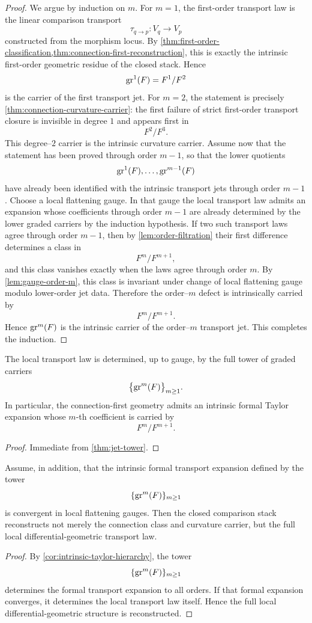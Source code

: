 \begin{proof}
	We argue by induction on \(m\).
	For \(m=1\), the first-order transport law is the linear comparison
	transport
	\[
		\tau_{q\to p}:V_q\to V_p
	\]
	constructed from the morphism locus.  By
	\cref{thm:first-order-classification,thm:connection-first-reconstruction},
	this is exactly the intrinsic first-order geometric residue of the
	closed stack.  Hence
	\[
		\operatorname{gr}^1(F)=F^1/F^2
	\]
	is the carrier of the first transport jet.
	For \(m=2\), the statement is precisely
	\cref{thm:connection-curvature-carrier}: the first failure of strict
	first-order transport closure is invisible in degree \(1\) and appears
	first in
	\[
		F^2/F^3.
	\]
	This degree--\(2\) carrier is the intrinsic curvature carrier.
	Assume now that the statement has been proved through order \(m-1\), so
	that the lower quotients
	\[
		\operatorname{gr}^1(F),\dots,\operatorname{gr}^{m-1}(F)
	\]
	have already been identified with the intrinsic transport jets through
	order \(m-1\).
	Choose a local flattening gauge.  In that gauge the local transport law
	admits an expansion whose coefficients through order \(m-1\) are already
	determined by the lower graded carriers by the induction hypothesis.  If
	two such transport laws agree through order \(m-1\), then by
	\cref{lem:order-filtration} their first difference determines a class in
	\[
		F^m/F^{m+1},
	\]
	and this class vanishes exactly when the laws agree through order \(m\).
	By \cref{lem:gauge-order-m}, this class is invariant under change of
	local flattening gauge modulo lower-order jet data.  Therefore the
	order--\(m\) defect is intrinsically carried by
	\[
		F^m/F^{m+1}.
	\]
	Hence \(\operatorname{gr}^m(F)\) is the intrinsic carrier of the order--\(m\)
	transport jet.  This completes the induction.
\end{proof}
\begin{corollary}
	\label{cor:intrinsic-taylor-hierarchy}
	The local transport law is determined, up to gauge, by the full tower of
	graded carriers
	\[
		\bigl\{\operatorname{gr}^m(F)\bigr\}_{m\ge 1}.
	\]
	In particular, the connection-first geometry admits an intrinsic formal
	Taylor expansion whose \(m\)-th coefficient is carried by
	\[
		F^m/F^{m+1}.
	\]
\end{corollary}
\begin{proof}
	Immediate from \cref{thm:jet-tower}.
\end{proof}
\begin{corollary}
	Assume, in addition, that the intrinsic formal transport expansion
	defined by the tower
	\[
		\{\operatorname{gr}^m(F)\}_{m\ge 1}
	\]
	is convergent in local flattening gauges.  Then the closed comparison
	stack reconstructs not merely the connection class and curvature
	carrier, but the full local differential-geometric transport law.
\end{corollary}
\begin{proof}
	By \cref{cor:intrinsic-taylor-hierarchy}, the tower
	\[
		\{\operatorname{gr}^m(F)\}_{m\ge 1}
	\]
	determines the formal transport expansion to all orders.  If that
	formal expansion converges, it determines the local transport law
	itself.  Hence the full local differential-geometric structure is
	reconstructed.
\end{proof}
